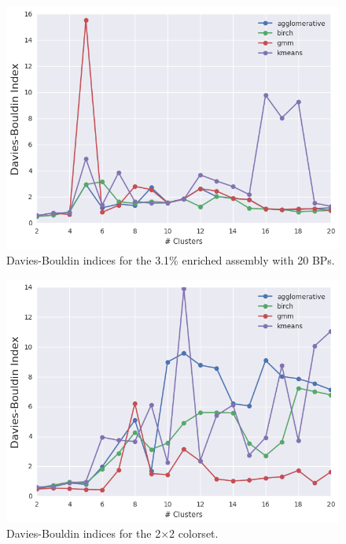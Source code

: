 \begin{figure}[h!]
\centering
\includegraphics[width=0.87\linewidth]{figures/results/model-select/assm-31-20BPs/db-combined-U238-capture-1}
\vspace{2mm}
\caption[Davies-Bouldin indices for the 3.1\% enriched assembly with 20 BPs]{Davies-Bouldin indices for the 3.1\% enriched assembly with 20 \acp{BP}.}
\label{fig:chap11-assm-31-20BPs-db-index}
\end{figure}

\clearpage

\begin{figure}[h!]
\centering
\includegraphics[width=0.87\linewidth]{figures/results/model-select/2x2/db-combined-U238-capture-1}
\vspace{2mm}
\caption[Davies-Bouldin indices for the 2$\times$2 colorset]{Davies-Bouldin indices for the 2$\times$2 colorset.}
\label{fig:chap11-2x2-db-index}
\end{figure}

